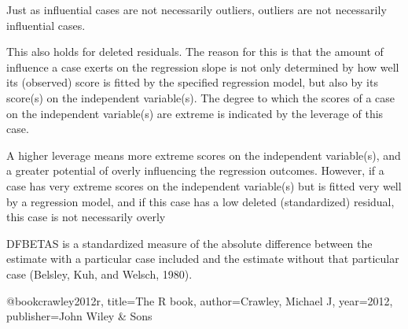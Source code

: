 Just as influential cases are not necessarily outliers, outliers are not necessarily influential cases. 

This also holds for deleted residuals. The reason for this is that the amount of influence a case exerts on the regression slope is not only determined by how well its (observed) score is fitted by the specified
regression model, but also by its score(s) on the independent variable(s). The degree to which the scores of a case on the independent variable(s) are extreme is indicated by the leverage of this case. 

A higher leverage means more extreme scores on the independent variable(s), and a greater potential of
overly influencing the regression outcomes. However, if a case has very extreme scores on the independent
variable(s) but is fitted very well by a regression model, and if this case has a low deleted (standardized)
residual, this case is not necessarily overly

DFBETAS is a standardized measure of the absolute difference between the estimate with a particular
case included and the estimate without that particular case (Belsley, Kuh, and Welsch, 1980).




@book{crawley2012r,
  title={The R book},
  author={Crawley, Michael J},
  year={2012},
  publisher={John Wiley \& Sons}
}
